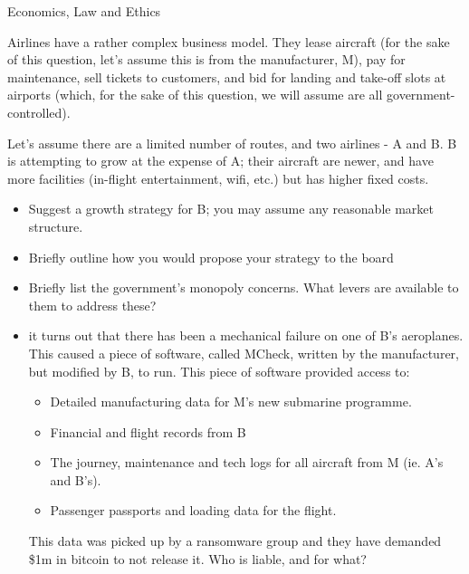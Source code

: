 \documentclass{tripos}  %
\begin{document}
\begin{question}[MockIB,year=2024,paper=1,question=3,author=rrw]{Economics, Law and Ethics}



Airlines have a rather complex business model. They lease aircraft
(for the sake of this question, let's assume this is from the
manufacturer, M), pay for maintenance, sell tickets to customers, and bid
for landing and take-off slots at airports (which, for the sake of
this question, we will assume are all government-controlled).

Let's assume there are a limited number of routes, and two airlines -
A and B. B is attempting to grow at the expense of A; their aircraft
are newer, and have more facilities (in-flight entertainment, wifi,
etc.) but has higher fixed costs.

\begin{itemize}
\item Suggest a growth strategy for B; you may assume any reasonable market structure. 
\item Briefly outline how you would propose your strategy to the board 
\item Briefly list the government's monopoly concerns. What levers are available to them to address these? 
\item it turns out that there has been a mechanical failure on one of B's aeroplanes. This caused a piece of software, called MCheck, written by the manufacturer, but modified by B, to run. This piece of software provided access to:
  \begin{itemize}
  \item Detailed manufacturing data for M's new submarine programme.
  \item Financial and flight records from B
  \item The journey, maintenance and tech logs for all aircraft from M (ie. A's and B's).
  \item Passenger passports and loading data for the flight.
  \end{itemize}


  This data was picked up by a ransomware group and they have demanded \$1m in bitcoin to not release it.
  Who is liable, and for what?
\end{itemize}
\end{question}
\end{document}
